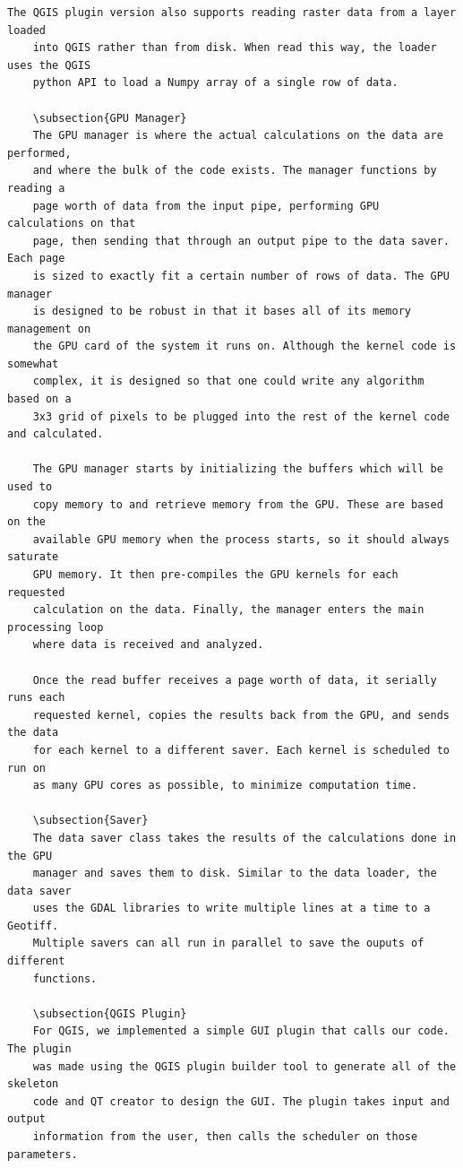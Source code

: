 \documentclass[journal]{IEEEtran}
\begin{document}
\begin{Verbatim}[frame=single]
    The QGIS plugin version also supports reading raster data from a layer loaded
    into QGIS rather than from disk. When read this way, the loader uses the QGIS
    python API to load a Numpy array of a single row of data.

    \subsection{GPU Manager}
    The GPU manager is where the actual calculations on the data are performed,
    and where the bulk of the code exists. The manager functions by reading a
    page worth of data from the input pipe, performing GPU calculations on that
    page, then sending that through an output pipe to the data saver. Each page
    is sized to exactly fit a certain number of rows of data. The GPU manager
    is designed to be robust in that it bases all of its memory management on
    the GPU card of the system it runs on. Although the kernel code is somewhat
    complex, it is designed so that one could write any algorithm based on a
    3x3 grid of pixels to be plugged into the rest of the kernel code and calculated.

    The GPU manager starts by initializing the buffers which will be used to
    copy memory to and retrieve memory from the GPU. These are based on the
    available GPU memory when the process starts, so it should always saturate
    GPU memory. It then pre-compiles the GPU kernels for each requested
    calculation on the data. Finally, the manager enters the main processing loop
    where data is received and analyzed.

    Once the read buffer receives a page worth of data, it serially runs each
    requested kernel, copies the results back from the GPU, and sends the data
    for each kernel to a different saver. Each kernel is scheduled to run on
    as many GPU cores as possible, to minimize computation time.

    \subsection{Saver}
    The data saver class takes the results of the calculations done in the GPU
    manager and saves them to disk. Similar to the data loader, the data saver
    uses the GDAL libraries to write multiple lines at a time to a Geotiff.
    Multiple savers can all run in parallel to save the ouputs of different
    functions.

    \subsection{QGIS Plugin}
    For QGIS, we implemented a simple GUI plugin that calls our code. The plugin
    was made using the QGIS plugin builder tool to generate all of the skeleton
    code and QT creator to design the GUI. The plugin takes input and output
    information from the user, then calls the scheduler on those parameters.


\end{Verbatim}
\end{document}
